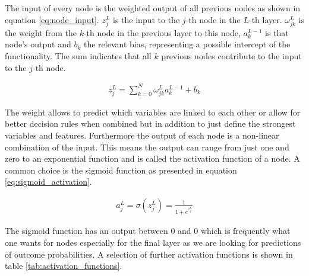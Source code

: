 The input of every node is the weighted output of all previous nodes as shown in equation \eqref{eq:node_input}. $z_j^L$ is the input to the $j$-th node in the $L$-th layer. $\omega_{jk}^L$ is the weight from the $k$-th node in the previous layer to this node, $a_k^{L-1}$ is that node's output and $b_k$ the relevant bias, representing a possible intercept of the functionality. The sum indicates that all $k$ previous nodes contribute to the input to the $j$-th node.

\begin{align}
    z_j^L = \sum_{k=0}^{N} \omega_{jk}^L a_k^{L-1} + b_k
    \label{eq:node_input}
\end{align}


The weight allows to predict which variables are linked to each other or allow for better decision rules when combined but in addition to just define the strongest variables and features. Furthermore the output of each node is a non-linear combination of the input. This means the output can range from just one and zero to an exponential function and is called the activation function of a node. A common choice is the sigmoid function as presented in equation \eqref{eq:sigmoid_activation}.~\cite{chollet2015keras}

\begin{align}
    a_j^L = \sigma ( z_j^L ) = \frac{1}{1 + e^{z_j^L}}
    \label{eq:sigmoid_activation}
\end{align}

The sigmoid function has an output between \num{0} and \num{0} which is frequently what one wants for nodes especially for the final layer as we are looking for predictions of outcome probabilities. A selection of further activation functions is shown in table \ref{tab:activation_functions}.

